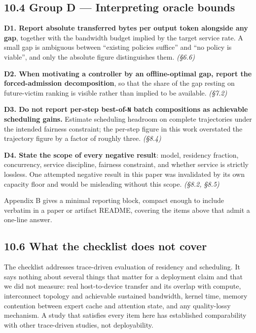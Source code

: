 \documentclass[
  10pt,
  letterpaper,
  10pt]{article}
\begin{document}
\subsection{10.4 Group D --- Interpreting oracle
bounds}\label{group-d-interpreting-oracle-bounds}

\textbf{D1. Report absolute transferred bytes per output token alongside
any gap}, together with the bandwidth budget implied by the target
service rate. A small gap is ambiguous between ``existing policies
suffice'' and ``no policy is viable'', and only the absolute figure
distinguishes them. \emph{(§6.6)}

\textbf{D2. When motivating a controller by an offline-optimal gap,
report the forced-admission decomposition}, so that the share of the gap
resting on future-victim ranking is visible rather than implied to be
available. \emph{(§7.2)}

\textbf{D3. Do not report per-step best-of-\texttt{N} batch compositions
as achievable scheduling gains.} Estimate scheduling headroom on
complete trajectories under the intended fairness constraint; the
per-step figure in this work overstated the trajectory figure by a
factor of roughly three. \emph{(§8.4)}

\textbf{D4. State the scope of every negative result}: model, residency
fraction, concurrency, service discipline, fairness constraint, and
whether service is strictly lossless. One attempted negative result in
this paper was invalidated by its own capacity floor and would be
misleading without this scope. \emph{(§8.2, §8.5)}

Appendix B gives a minimal reporting block, compact enough to include
verbatim in a paper or artifact README, covering the items above that
admit a one-line answer.

\subsection{10.6 What the checklist does not
cover}\label{what-the-checklist-does-not-cover}

The checklist addresses trace-driven evaluation of residency and
scheduling. It says nothing about several things that matter for a
deployment claim and that we did not measure: real host-to-device
transfer and its overlap with compute, interconnect topology and
achievable sustained bandwidth, kernel time, memory contention between
expert cache and attention state, and any quality-lossy mechanism. A
study that satisfies every item here has established comparability with
other trace-driven studies, not deployability.
\end{document}
